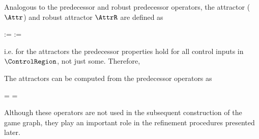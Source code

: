 \stopsection


\startsubsection[title={Attractors}]

    Analogous to the predecessor and robust predecessor operators, the attractor ($\Attr$) and robust attractor $\AttrR$ are defined as

    \startformula
        \startalign[n=2,align={right,left}]
            \NC {} :=
            \NC {} \EndAnd
            \NR
            \NC {} :=
            \NC {} \EndComma
            \NR
        \stopalign
    \stopformula

    i.e. for the attractors the predecessor properties hold for all control inputs in $\ControlRegion$, not just some.
    Therefore,

    \startformula
        \startalign[n=2,align={right,left}]
            \NC {} \subseteq
            \NC {} \EndComma
            \NR
            \NC {} \subseteq
            \NC {} \EndAnd
            \NR
            \NC {} \subseteq
            \NC {} \EndPeriod
            \NR
        \stopalign
    \stopformula

    The attractors can be computed from the predecessor operators as

    \startformula
        \startalign[n=2,align={right,left}]
            \NC {} =
            \NC \StateRegion \setminus {} \EndComma
            \NR
            \NC {} =
            \NC \StateRegion \setminus {} \EndPeriod
            \NR
        \stopalign
    \stopformula

    Although these operators are not used in the subsequent construction of the game graph, they play an important role in the refinement procedures presented later.

